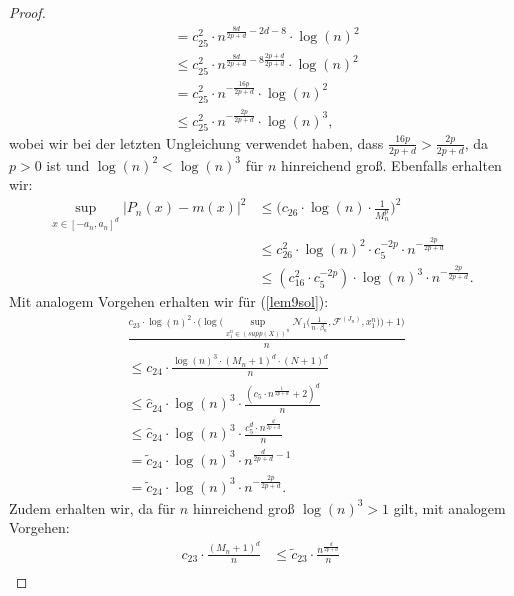 \begin{proof}
\begin{equation}
\begin{split}
& = c_{25}^2 \cdot n^{\frac{8d}{2p + d} - 2d -8} \cdot \log(n)^2 \\
& \leq c_{25}^2 \cdot n^{\frac{8d}{2p + d}  -8\frac{2p + d}{2p + d}} \cdot \log(n)^2 \\
& = c_{25}^2 \cdot n^{-\frac{16p}{2p + d}} \cdot \log(n)^2 \\
& \leq c_{25}^2 \cdot n^{-\frac{2p}{2p + d}} \cdot \log(n)^3,
\end{split}
\end{equation}
wobei wir bei der letzten Ungleichung verwendet haben, dass $\frac{16p}{2p + d} > \frac{2p}{2p + d}$, da $p > 0$ ist und $\log(n)^2 < \log(n)^3$ für $n$ hinreichend groß. Ebenfalls erhalten wir:
\begin{equation}
\label{4thsum}
\begin{split}
\sup_{x \in [-a_n, a_n]^d} |P_n(x) - m(x)|^2 & \leq \bigg(c_{26} \cdot \log(n) \cdot \frac{1}{M_n^p}\bigg)^2 \\
& \leq c_{26}^2 \cdot \log(n)^2 \cdot c_{5}^{-2p} \cdot n^{-\frac{2p}{2p + d}} \\
& \leq (c_{16}^2 \cdot c_{5}^{-2p}) \cdot \log(n)^3 \cdot n^{-\frac{2p}{2p + d}}.
\end{split}
\end{equation}
Mit analogem Vorgehen erhalten wir für (\ref{lem9sol}):
\begin{equation}
\begin{split}
& \frac{c_{23} \cdot \log(n)^2 \cdot \big(\log\big(\sup_{x_1^n \in (supp(X))^n}\mathcal{N}_1\big(\frac{1}{n \cdot \beta_n},\mathcal{F}^{(J_n)},x_1^n\big)\big) + 1\big)}{n} \\
& \leq c_{24} \cdot \frac{\log(n)^3 \cdot (M_n + 1)^d \cdot (N + 1)^d}{n} \\
& \leq \hat{c}_{24} \cdot \log(n)^3 \cdot \frac{(c_5 \cdot n^{\frac{1}{2p + d}} + 2)^d}{n} \\
& \leq \hat{c}_{24} \cdot \log(n)^3 \cdot \frac{c_5^d\cdot n^{\frac{d}{2p + d}}}{n} \\
& = \tilde{c}_{24} \cdot \log(n)^3 \cdot n^{\frac{d}{2p + d} - 1} \\
& = \tilde{c}_{24} \cdot \log(n)^3 \cdot n^{-\frac{2p}{2p + d}}.
\end{split}
\end{equation}
Zudem erhalten wir, da für $n$ hinreichend groß $\log(n)^3 > 1$ gilt, mit analogem Vorgehen:
\begin{equation}
\label{5thsum}
\begin{split}
c_{23} \cdot \frac{(M_n + 1)^d}{n} & \leq \tilde{c}_{23} \cdot \frac{n^{\frac{d}{2p + d}}}{n} \\

\end{split}
\end{equation}
\end{proof}

